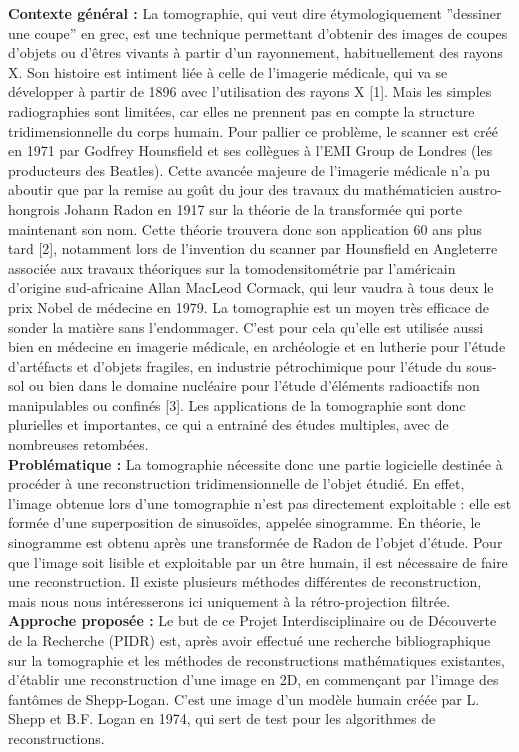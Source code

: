 \documentclass[conference]{IEEEtran}
\begin{document}
\textbf{Contexte général :}
La tomographie, qui veut dire étymologiquement ”dessiner une coupe” en grec, est une technique permettant d’obtenir des images de coupes d’objets ou d’êtres vivants à partir d'un rayonnement, habituellement des rayons X. Son histoire est intiment liée à celle de l’imagerie médicale, qui va se développer à partir de 1896 avec l’utilisation des rayons X [1]. Mais les simples radiographies sont limitées, car elles ne prennent pas en compte la structure tridimensionnelle du corps humain. Pour pallier ce problème, le scanner est créé en 1971 par Godfrey Hounsfield et ses collègues à l’EMI Group de Londres (les producteurs des Beatles). Cette avancée majeure de l’imagerie médicale n’a pu aboutir que par la remise au goût du jour des travaux du mathématicien austro-hongrois Johann Radon en 1917 sur la théorie de la transformée qui porte maintenant son nom. Cette théorie trouvera donc son application 60 ans plus tard [2], notamment lors de l'invention du scanner par Hounsfield en Angleterre associée aux travaux théoriques sur la tomodensitométrie par l’américain d’origine sud-africaine Allan MacLeod Cormack, qui leur vaudra à tous deux le prix Nobel de médecine en 1979.
La tomographie est un moyen très efficace de sonder la matière sans l’endommager. C’est pour cela qu’elle est utilisée aussi bien en médecine en imagerie médicale, en archéologie et en lutherie pour l’étude d’artéfacts et d’objets fragiles, en industrie pétrochimique pour l’étude du sous-sol ou bien dans le domaine nucléaire pour l’étude d’éléments radioactifs non manipulables ou confinés [3]. Les applications de la tomographie sont donc plurielles et importantes, ce qui a entrainé des études multiples, avec de nombreuses retombées.
\\
\textbf{Problématique :}
La tomographie nécessite donc une partie logicielle destinée à procéder à une reconstruction tridimensionnelle de l’objet étudié. En effet, l’image obtenue lors d’une tomographie n’est pas directement exploitable : elle est formée d’une superposition de sinusoïdes, appelée sinogramme. En théorie, le sinogramme est obtenu après une transformée de Radon de l’objet d’étude. Pour que l’image soit lisible et exploitable par un être humain, il est nécessaire de faire une reconstruction. Il existe plusieurs méthodes différentes de reconstruction, mais nous nous intéresserons ici uniquement à la rétro-projection filtrée.
\\
\textbf{Approche proposée :}
Le but de ce Projet Interdisciplinaire ou de Découverte de la Recherche (PIDR) est, après avoir effectué une recherche bibliographique sur la tomographie et les méthodes de reconstructions mathématiques existantes,  d’établir une reconstruction d’une image en 2D, en commençant par l’image des fantômes de Shepp-Logan. C’est une image d’un modèle humain créée par L. Shepp et B.F. Logan en 1974, qui sert de test pour les algorithmes de reconstructions.
\end{document}
